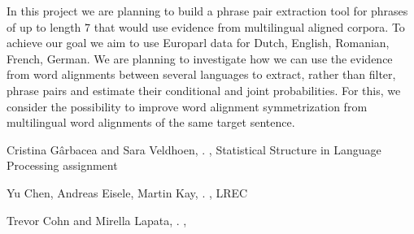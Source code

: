 \documentclass[11pt]{article}
\begin{document}
In this project we are planning to build a phrase pair extraction tool for phrases of up to length 7 that would use evidence from multilingual aligned corpora. To achieve our goal we aim to use Europarl %
data for Dutch, English, Romanian, French, German. %
We are planning to investigate how we can use the evidence from word alignments between several languages to extract, rather than filter, phrase pairs and estimate their conditional and joint probabilities. For this, we consider the possibility to improve word alignment symmetrization from multilingual word alignments of the same target sentence.
\begin{thebibliography}{}

{Cristina G{\^a}rbacea and Sara Veldhoen},
.
,
\newblock Statistical Structure in Language Processing assignment

{Yu Chen, Andreas Eisele, Martin Kay},
.
,
\newblock LREC

{Trevor Cohn and Mirella Lapata},
.
,



\end{thebibliography}
\end{document}
